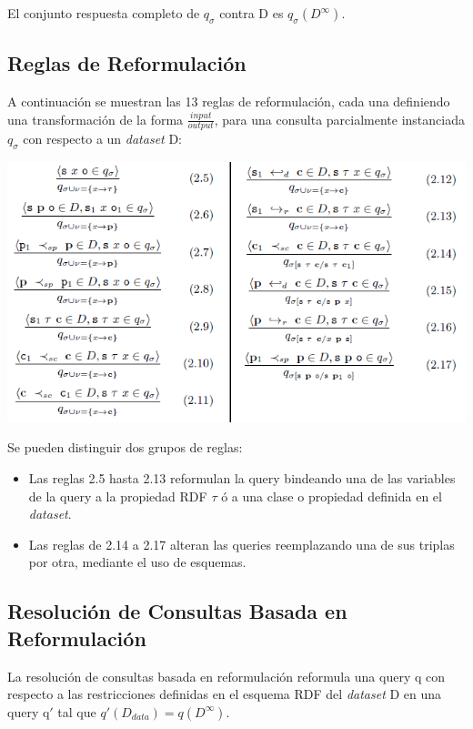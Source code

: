 \documentclass[10pt,a4paper]{article}
\begin{document}
El conjunto respuesta completo de $q_{\sigma}$ contra D es $q_{\sigma}(D^{\infty})$.

\subsection{Reglas de Reformulación}

A continuación se muestran las 13 reglas de reformulación, cada una definiendo una transformación de la forma $\frac{input}{output}$, para una consulta parcialmente instanciada $q_{\sigma}$ con respecto a un \textit{dataset} D:

\begin{center}
\includegraphics[scale=0.8]{imgs/02.png}
\end{center}

Se pueden distinguir dos grupos de reglas:
\begin{itemize}

\item Las reglas 2.5 hasta 2.13 reformulan la query bindeando una de las variables de la query a la propiedad RDF $\tau$ ó a una clase o propiedad definida en el \textit{dataset}.

\item Las reglas de 2.14 a 2.17 alteran las queries reemplazando una de sus triplas por otra, mediante el uso de esquemas.

\end{itemize}

\subsection{Resolución de Consultas Basada en Reformulación}

La resolución de consultas basada en reformulación reformula una query q con respecto a las restricciones definidas en el esquema RDF del \textit{dataset} D en una query q$'$ tal que $q'(D_{data}) = q(D^{\infty})$.\\
\end{document}
